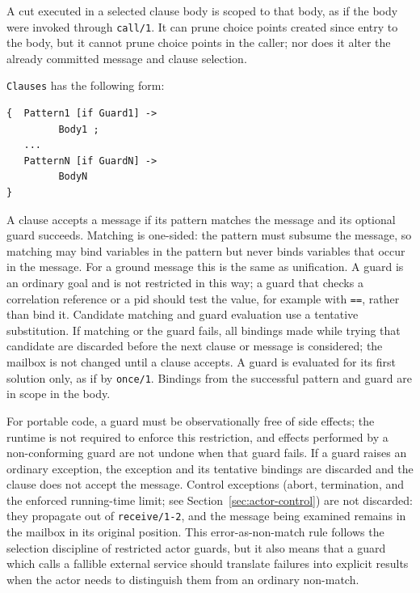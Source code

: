 A cut executed in a selected clause body is scoped to that body, as if the
body were invoked through \texttt{call/\allowbreak{}1}. It can prune choice points created
since entry to the body, but it cannot prune choice points in the caller; nor
does it alter the already committed message and clause selection.

\texttt{Clauses} has the following form:

\begin{verbatim}
{  Pattern1 [if Guard1] ->
         Body1 ;
   ...
   PatternN [if GuardN] ->
         BodyN
}
\end{verbatim}

\noindent A clause accepts a message if its pattern matches the message and its optional guard succeeds. Matching is one-sided: the pattern must subsume the message, so matching may bind variables in the pattern but never binds variables that occur in the message. For a ground message this is the same as unification. A guard is an ordinary goal and is not restricted in this way; a guard that checks a correlation reference or a pid should test the value, for example with \texttt{==}, rather than bind it. Candidate matching and guard evaluation use
a tentative substitution. If matching or the guard fails, all bindings
made while trying that candidate are discarded before the next clause or
message is considered; the mailbox is not changed until a clause accepts.
A guard is evaluated for its first solution only, as if by \texttt{once/\allowbreak{}1}.
Bindings from the successful pattern and guard are in scope in the body.

For portable code, a guard must be observationally free of side effects; the
runtime is not required to enforce this restriction, and effects performed by
a non-conforming guard are not undone when that guard fails. If a guard raises an ordinary exception, the exception and its tentative bindings are discarded and the clause does not accept the message. Control exceptions (abort, termination, and the enforced running-time limit; see Section~\ref{sec:actor-control}) are not discarded: they propagate out of \texttt{receive/\allowbreak{}1-2}, and the message being examined remains in the mailbox in its original position. This error-as-non-match rule follows the
selection discipline of restricted actor guards, but it also means that a
guard which calls a fallible external service should translate failures into
explicit results when the actor needs to distinguish them from an ordinary
non-match.

